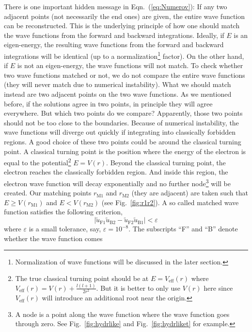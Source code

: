 There is one important hidden message in Eqn.~(\ref{eq:Numerov}):
If any two adjacent points (not necessarily the end ones) are given,
the entire wave function can be reconstructed. This is the underlying
principle of how one should match the wave functions from the forward and
backward integrations. Ideally, if $E$ is an eigen-energy, the resulting
wave functions from the forward and backward integrations will be identical
(up to a normalization\footnote{Normalization of wave functions will be
discussed in the later section.} factor). On the other hand, if $E$ is not an
eigen-energy, the wave functions will not match. To check whether two wave functions
matched or not, we do not compare the entire wave functions (they
will never match due to numerical instability). What we should match instead
are two adjacent points on the two wave functions.
As we mentioned before, if the solutions agree in two points, in principle
they will agree everywhere. But which two points do we compare?
Apparently, those two points should not be too close to the boundaries. Because of
numerical instability, the wave functions will diverge out quickly if integrating
into classically forbidden regions. A good choice of these two points could be around
the classical turning point. A classical turning point is the position where
the energy of the electron is equal to the potential\footnote{The true classical turning
point should be at $E=V_{\text{eff}}(r)$ where $V_{\text{eff}}(r)=V(r)+\frac{l(l+1)}{2r^2}$.
But it is better to only use $V(r)$ here since $V_{\text{eff}}(r)$ will introduce an additional
root near the origin.} $E=V(r)$. Beyond the classical turning point,
the electron reaches the classically forbidden region. And inside this region,
the electron wave function will decay exponentially and no further node\footnote{A node
is a point along the wave function where the wave function goes through zero.
See Fig.~\ref{fig:hydrlike} and Fig.~\ref{fig:hydrliket} for example.} will
be created. Our matching points $r_{\text{M1}}$ and $r_{\text{M2}}$ (they are adjacent)
are taken such that $E \ge V(r_{\text{M1}})$ and $E<V(r_{\text{M2}})$ (see Fig.~\ref{fig:r1r2}).
A so called matched wave function satisfies the following criterion,
\begin{equation} \label{eq:crit}
\big|\tilde{u}_{\text{F}1} \tilde{u}_{\text{B}2} - \tilde{u}_{\text{F}2} \tilde{u}_{\text{B}1}\big| < \varepsilon
\end{equation}
where $\varepsilon$ is a small tolerance, say, $\varepsilon=10^{-8}$.
The subscripts ``F'' and ``B'' denote whether the wave function comes
